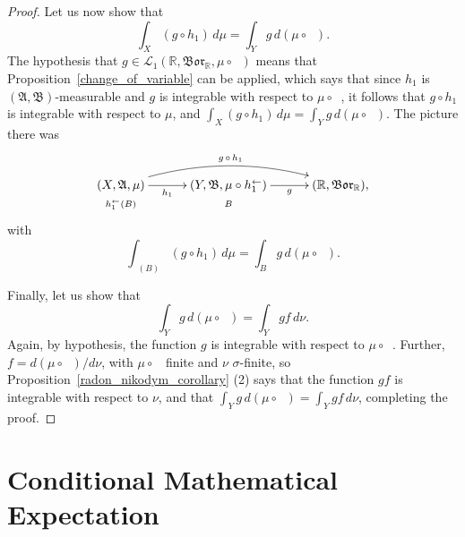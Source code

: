 \documentclass[
twoside=true,
paper=letter,
fontsize=9pt,
pagesize=auto,
leqno,
openany,
headsepline,
overfullrule,
]{scrbook}
\theoremstyle{plain}
\theoremstyle{plain}
\theoremstyle{definition}
\theoremstyle{bfnoteitalic}
\theoremstyle{bfnoteroman}
\newcommand{\sigalg}[1]{\mathfrak{#1}}
\newcommand{\cali}[1]{\mathscr{#1}}
\newcommand{\borel}{\mathfrak{Bor}}
\newcommand{\textsigma}{\hbox{\large{$\sigma$}}\kern-1pt}
\newcommand{\preimage}[1]{\mathop{#1^{\leftarrow}}}
\newcommand{\R}{\mathbb{R}}
\newcommand{\sigmaalgebra}{\sigalg{A}}
\newcommand{\sigmaalgebraii}{\sigalg{B}}
\newcommand{\funcf}{f}
\newcommand{\funcg}{g}
\newcommand{\funch}{h}
\newcommand{\functionii}{g}
\newcommand{\functioniii}{h}
\newcommand{\measurespace}{X}
\newcommand{\measurespaceii}{Y}
\newcommand{\measure}{\mu}
\newcommand{\measmu}{\mu}
\newcommand{\measnu}{\nu}
\newcommand{\setii}{B}
\begin{document}
\begin{proof}
Let us now show that
\[
\int_\measurespace (\funcg \circ \funch_1) \,d\measure
=
\int_\measurespaceii \funcg \, d(\measmu\circ \preimage{\funch_1}) .
\]
The hypothesis that
$\functionii \in\cali{L}_1(\R, \borel_\R,\measure\circ\preimage{\functioniii_i})$
means that Proposition~\ref{change_of_variable}  can be applied, which says that since 
$\funch_1$ is 
$(\sigmaalgebra,\sigmaalgebraii)$\hyp{}measurable and
$\funcg$ is integrable with respect to 
$\measmu \circ \preimage{\funch_1}$, it follows that 
$\funcg \circ \funch_1$ 
is integrable with respect to $\measmu$, and
$\int_\measurespace (\funcg\circ\funch_1)\,d\mu
=
\int_\measurespaceii \funcg \, d(\measmu\circ \preimage{\funch_1})$. The picture there was
\[
\xymatrix@R=0pt@C=30pt{ 
(\measurespace,\sigmaalgebra,\measure)
\ar[r]_-{\funch_1} \ar@/^16pt/[rr]^{\funcg\, \circ\, \funch_1}
& (\measurespaceii,\sigmaalgebraii,\measmu\circ \preimage{\funch_1}) 
\ar[r]_-{\funcg}
& (\R,\borel_\R), \\
\scriptstyle{\preimage{\funch_1}(\setii)} & \scriptstyle{\setii} & \\
}
\]
with
\[
\int_{\preimage{\funch_1}(\setii)} (\funcg \circ \funch_1) \, d\measure
= \int_\setii \funcg \, d(\measmu\circ \preimage{\funch_1}).
\]

Finally, let us show that 
\[
\int_\measurespaceii \funcg \, d(\measmu\circ \preimage{\funch_1})
=
\int_\measurespaceii \funcg \funcf \, d\measnu.
\]
Again, by hypothesis, the function $\funcg$ is integrable with respect to 
$\measmu\circ \preimage{\funch_1}$. Further, 
$\funcf = d(\measmu\circ\preimage{\funch_1})/d\measnu$, with 
$\measmu\circ\preimage{\funch_1}$ finite and $\measnu$ \textsigma-finite, so
Proposition~\ref{radon_nikodym_corollary} (2) says that the function
$\funcg\funcf$
is integrable with respect to $\measnu$, and that
$\int_\measurespaceii \funcg \, d(\measmu\circ \preimage{\funch_1})
=
\int_\measurespaceii \funcg \funcf \, d\measnu$,
completing the proof.
\end{proof}






\chapter{Conditional Mathematical Expectation}
\end{document}
